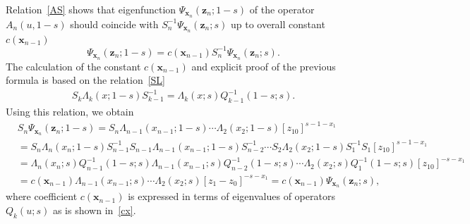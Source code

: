 \documentclass[10pt,a4paper]{amsart}
\numberwithin{equation}{section}
\begin{document}
Relation~\eqref{AS} shows that eigenfunction $\Psi_{\bm x_n}(\bm z_n;1-s)$
of the operator $A_n(u,1-s)$ should coincide with
$S^{-1}_n\Psi_{\bm x_n}(\bm z_n;s)$ up to overall constant $c(\bm x_{n-1})$
\begin{equation*}
\Psi_{\bm x_n}(\bm z_n;1-s) = c(\bm x_{n-1})
S^{-1}_n \Psi_{\bm x_n}(\bm z_n;s) .
\end{equation*}
The calculation of the constant $c(\bm x_{n-1})$ and explicit proof
of the previous formula is based on the relation~\eqref{SL}
\begin{align*}
S_k \Lambda_k(x;1-s) S^{-1}_{k-1} =
\Lambda_k(x;s) Q^{-1}_{k-1}(1-s;s) .
\end{align*}
Using this relation, we obtain
\begin{align*}
&
S_n \Psi_{\bm{x}_n}(\bm z_n;1-s ) =
S_n \Lambda_{n-1}( x_{n-1};1-s)\cdots
\Lambda_{2}( x_{2};1-s) [z_{10}]^{s-1-x_1} \\
& =\!
S_n \Lambda_n(x_n;1-s) S^{-1}_{n-1}
S_{n-1}\Lambda_{n-1}( x_{n-1};1-s) S^{-1}_{n-2}\cdots
S_{2} \Lambda_{2}( x_{2};1-s) S^{-1}_{1} S_{1} [z_{10}]^{s-1-x_1} \\
& =\!
\Lambda_n(x_n;s) Q^{-1}_{n-1}(1-s;s)
\Lambda_{n-1}( x_{n-1};s) Q^{-1}_{n-2}(1-s;s)\cdots
\Lambda_{2}( x_{2};s) Q^{-1}_{1}(1-s;s) [z_{10}]^{-s-x_1} \\
& =\!
c(\bm x_{n-1})
\Lambda_{n-1}( x_{n-1};s)\cdots
\Lambda_{2}( x_{2};s) [z_1-z_0]^{-s-x_1} =
c(\bm x_{n-1}) \Psi_{\bm{x}_n}(\bm z_n; s) ,
\end{align*}
where coefficient $c(\bm x_{n-1})$ is expressed in terms of
eigenvalues of operators $Q_k(u;s)$ as is shown in~\eqref{cx}.
\end{document}
